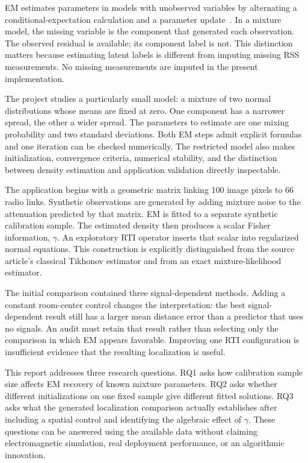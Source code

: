 \documentclass[conference,letterpaper]{IEEEtran}
\begin{document}
EM estimates parameters in models with unobserved variables by alternating a conditional-expectation calculation and a parameter update~\cite{dempster1977}. In a mixture model, the missing variable is the component that generated each observation. The observed residual is available; its component label is not. This distinction matters because estimating latent labels is different from imputing missing RSS measurements. No missing measurements are imputed in the present implementation.

The project studies a particularly small model: a mixture of two normal distributions whose means are fixed at zero. One component has a narrower spread, the other a wider spread. The parameters to estimate are one mixing probability and two standard deviations. Both EM steps admit explicit formulas and one iteration can be checked numerically. The restricted model also makes initialization, convergence criteria, numerical stability, and the distinction between density estimation and application validation directly inspectable.

The application begins with a geometric matrix linking 100 image pixels to 66 radio links. Synthetic observations are generated by adding mixture noise to the attenuation predicted by that matrix. EM is fitted to a separate synthetic calibration sample. The estimated density then produces a scalar Fisher information, $\gamma$. An exploratory RTI operator inserts that scalar into regularized normal equations. This construction is explicitly distinguished from the source article's classical Tikhonov estimator and from an exact mixture-likelihood estimator.

The initial comparison contained three signal-dependent methods. Adding a constant room-center control changes the interpretation: the best signal-dependent result still has a larger mean distance error than a predictor that uses no signals. An audit must retain that result rather than selecting only the comparison in which EM appears favorable. Improving one RTI configuration is insufficient evidence that the resulting localization is useful.

This report addresses three research questions. RQ1 asks how calibration sample size affects EM recovery of known mixture parameters. RQ2 asks whether different initializations on one fixed sample give different fitted solutions. RQ3 asks what the generated localization comparison actually establishes after including a spatial control and identifying the algebraic effect of $\gamma$. These questions can be answered using the available data without claiming electromagnetic simulation, real deployment performance, or an algorithmic innovation.
\end{document}

